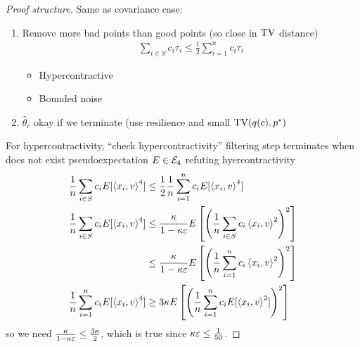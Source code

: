 \begin{proof}[Proof structure]
  Same as covariance case:
  \begin{enumerate}
    \item Remove more bad points than good points (so close in $\operatorname{TV}$ distance)
      \begin{align}
	\sum_{i \in S} c_i \tau_i \leq \frac{1}{2} \sum_{i=1}^n c_i \tau_i
      \end{align}
      \begin{itemize}
	\item Hypercontractive 
	\item Bounded noise
      \end{itemize}
    \item $\hat{\theta}_c$ okay if we terminate (use resilience and small $\operatorname{TV}(q(c), p^*)$
  \end{enumerate}

  For hypercontractivity, ``check hypercontractivity''
  filtering step terminates when does not exist pseudoexpectation $E
  \in \mathcal{E}_4$ refuting hyercontractivity
  \begin{align}
    \frac{1}{n} \sum_{i \in S} c_i E[\braket{x_i, v}^4]
    &\leq \frac{1}{2}  \frac{1}{n}  \sum_{i=1}^n c_i E[\braket{x_i, v}^4] \\
    \frac{1}{n} \sum_{i \in S} c_i E[\braket{x_i, v}^4]
    &\leq \frac{\kappa}{1 - \kappa \varepsilon}  E\left[\left(
	\frac{1}{n}  \sum_{i \in S} c_i \braket{x_i, v}^2
    \right)^2\right] \\
    &\leq \frac{\kappa}{1 - \kappa \varepsilon}  E\left[\left(
	\frac{1}{n}  \sum_{i=1}^n c_i \braket{x_i, v}^2
    \right)^2\right] \\
    \frac{1}{n}  \sum_{i=1}^n c_i E[\braket{x_i, v}^4]
    &\geq 3 \kappa E\left[\left(
	\frac{1}{n} \sum^{n}_{i=1} c_i E[\braket{x_i, v}^2]
    \right)^2\right]
  \end{align}
  so we need $\frac{\kappa}{1 - \kappa \varepsilon} \leq \frac{3 \kappa}{2}$,
  which is true since $\kappa \varepsilon \leq \frac{1}{50}$.


\end{proof}
